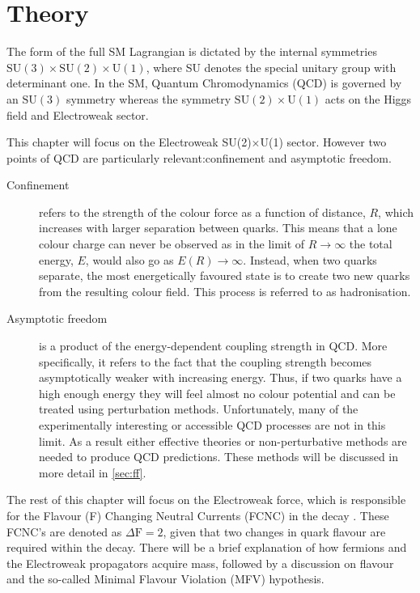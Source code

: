 \chapter{Theory}
\label{chap:theory}
The form of the full \gls{SM} Lagrangian is dictated by the internal symmetries $\mathrm{SU(3)\times SU(2)\times U(1)}$, where \Gls{SU} denotes the special unitary group with determinant one.  In the SM, Quantum Chromodynamics (\Gls{QCD}) is governed by an $\mathrm{SU(3)}$ symmetry whereas the symmetry $\mathrm{SU(2)\times U(1)}$ acts on the Higgs field and Electroweak sector.

This chapter will focus on the Electroweak SU(2)$\times$U(1) sector. However two points of QCD are particularly relevant:confinement and asymptotic freedom.
\begin{description}
\item [Confinement] refers to the strength of the colour force as a function of distance, $R$, which increases with larger separation between quarks. This means that a lone colour charge can never be observed as in the limit of $R\to \infty$ the total energy, $E$, would also go as $E(R)\to \infty$. Instead, when two quarks separate, the most energetically favoured state is to create two new quarks from the resulting colour field. This process is referred to as hadronisation.

\item[Asymptotic freedom] is a product of the energy-dependent coupling strength in QCD. More specifically, it refers to the fact that the coupling strength becomes asymptotically weaker with increasing energy. %
  Thus, if two quarks have a high enough energy they will feel almost no colour potential and can be treated using perturbation methods. Unfortunately, many of the experimentally interesting or accessible QCD processes are not in this limit. As a result either effective theories or non-perturbative methods are needed to produce QCD predictions. These methods will be discussed in more detail in \autoref{sec:ff}.
 
\end{description}
The rest of this chapter will focus on the Electroweak force, which is responsible for the Flavour (F) Changing Neutral Currents (\Gls{FCNC}) in the decay \Lbpi. These FCNC's are denoted as $\Delta \mathrm{F} = 2$, given that two changes in quark flavour are required within the decay. There will be a brief explanation of how fermions and the Electroweak propagators acquire mass, followed by a discussion on flavour and the so-called Minimal Flavour Violation (\Gls{MFV}) hypothesis.

